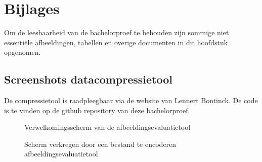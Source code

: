 \chapter{Bijlages}
\label{ch:bijlages}

Om de leesbaarheid van de bachelorproef te behouden zijn sommige niet essentiële afbeeldingen, tabellen en overige documenten in dit hoofdstuk opgenomen. 


\section{Screenshots datacompressietool}
\label{sec:bijlages-screenshot-datacompressietool}

De \gls{compressietool} is raadpleegbaar via de website van Lennert Bontinck. De code is te vinden op de \gls{github} repository van deze bachelorproef.


\begin{figure}[h!]
	\caption{Verwelkomingsscherm van de \gls{afbeeldingsevaluatietool}}
	\label{fig:bijlages-screenshot-datacompressietool-index}
\end{figure}


\begin{figure}[h!]
	\caption{Scherm verkregen door een bestand te encoderen \gls{afbeeldingsevaluatietool}}
	\label{fig:bijlages-screenshot-datacompressietool-encoded}
\end{figure}


